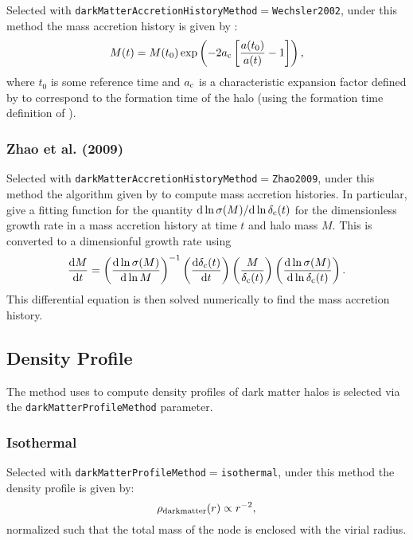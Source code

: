 Selected with {\tt darkMatterAccretionHistoryMethod}$=${\tt Wechsler2002}, under this method the mass accretion history is given by \citep{wechsler_concentrations_2002}:
\begin{equation}
M(t) = M(t_0) \exp \left( - 2 a_{\rm c} \left[ {a(t_0)\over a(t)}-1 \right] \right),
\end{equation}
where $t_0$ is some reference time and $a_{\rm c}$ is a characteristic expansion factor defined by \cite{wechsler_concentrations_2002} to correspond to the formation time of the halo (using the formation time definition of \citealt{bullock_profiles_2001}).

\subsubsection{Zhao et al. (2009)}

Selected with {\tt darkMatterAccretionHistoryMethod}$=${\tt Zhao2009}, under this method the algorithm given by \cite{zhao_accurate_2009} to compute mass accretion histories. In particular, \cite{zhao_accurate_2009} give a fitting function for the quantity ${\rm d} \ln \sigma(M)/{\rm d} \ln  \delta_{\rm c}(t)$ for the dimensionless growth rate in a mass accretion history at time $t$ and halo mass $M$. This is converted to a dimensionful growth rate using
\begin{equation}
 {{\rm d} M \over {\rm d} t} = \left({{\rm d} \ln \sigma(M) \over {\rm d} \ln M}\right)^{-1} \left({{\rm d} \delta_c(t) \over {\rm d} t}\right) \left( {M \over \delta_{\rm c}(t)} \right) \left({{\rm d} \ln \sigma(M) \over {\rm d} \ln \delta_{\rm c}(t)}\right).
\end{equation}
This differential equation is then solved numerically to find the mass accretion history.

\subsection{Density Profile}

The method uses to compute density profiles of dark matter halos is selected via the {\tt darkMatterProfileMethod} parameter.

\subsubsection{Isothermal}

Selected with {\tt darkMatterProfileMethod}$=${\tt isothermal}, under this method the density profile is given by:
\begin{equation}
 \rho_{\rm dark matter}(r) \propto r^{-2},
\end{equation}
normalized such that the total mass of the \gls{node} is enclosed with the virial radius.

